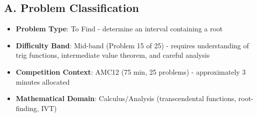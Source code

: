 \documentclass[]{article}
\begin{document}
\begin{problemconfigbox}
\subsection*{A. Problem Classification}
\begin{itemize}[leftmargin=*]
    \item \textbf{Problem Type}: To Find - determine an interval containing a root
    \item \textbf{Difficulty Band}: Mid-band (Problem 15 of 25) - requires understanding of trig functions, intermediate value theorem, and careful analysis
    \item \textbf{Competition Context}: AMC12 (75 min, 25 problems) - approximately 3 minutes allocated
    \item \textbf{Mathematical Domain}: Calculus/Analysis (transcendental functions, root-finding, IVT)
\end{itemize}


\end{problemconfigbox}
\end{document}
